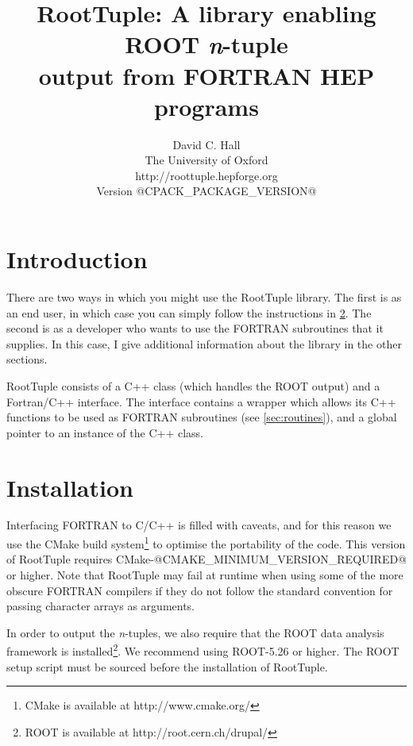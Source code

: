 \documentclass[a4paper,12pt]{article}
\begin{document}
\title{RootTuple: A library enabling ROOT \emph{n}-tuple\\ output from FORTRAN HEP programs}
\author{David C. Hall\\ The University of Oxford\\[0.5cm]
http://roottuple.hepforge.org\\[0.5cm]
Version @CPACK_PACKAGE_VERSION@}
\date{}
\maketitle

\tableofcontents
\newpage

\section{Introduction}
\label{sec:intro}
There are two ways in which you might use the RootTuple library. The first is as an end user, in which case you can simply follow the instructions in \textsection\ref{sec:install}. The second is as a developer who wants to use the FORTRAN subroutines that it supplies. In this case, I give additional information about the library in the other sections.

RootTuple consists of a C++ class (which handles the ROOT output) and a Fortran/C++ interface. The interface contains a wrapper which allows its C++ functions to be used as FORTRAN subroutines (see \textsection\ref{sec:routines}), and a global pointer to an instance of the C++ class.

\section{Installation}
\label{sec:install}
Interfacing FORTRAN to C/C++ is filled with caveats, and for this reason we use the CMake build system\footnote{CMake is available at http://www.cmake.org/} to optimise the portability of the code. This version of RootTuple requires CMake-@CMAKE_MINIMUM_VERSION_REQUIRED@ or higher. Note that RootTuple may fail at runtime when using some of the more obscure FORTRAN compilers if they do not follow the standard convention for passing character arrays as arguments.

In order to output the \emph{n}-tuples, we also require that the ROOT data analysis framework is installed\footnote{ROOT is available at http://root.cern.ch/drupal/}. We recommend using ROOT-5.26 or higher. The ROOT setup script must be sourced before the installation of RootTuple.
\end{document}
